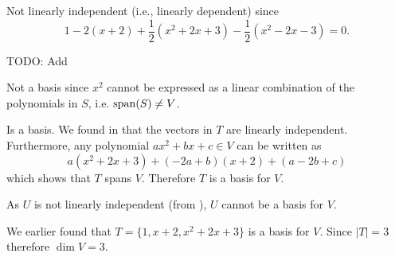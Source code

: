 \begin{questions}
\begin{partquestions}{\alph*}
        \item Not linearly independent (i.e., linearly dependent) since
        \[
            1 - 2(x+2) + \frac12(x^2 + 2x + 3) - \frac12(x^2 - 2x - 3) = 0.
        \]
    \end{partquestions}

    \item TODO: Add

    \item \begin{partquestions}{\alph*}
        \item Not a basis since $x^2$ cannot be expressed as a linear combination of the polynomials in $S$, i.e. $\mathrm{span}(S) \neq V$.

        \item Is a basis. We found in  that the vectors in $T$ are linearly independent. Furthermore, any polynomial $ax^2 + bx + c \in V$ can be written as
        \[
            a(x^2+2x+3) + (-2a+b)(x+2) + (a-2b+c)
        \]
        which shows that $T$ spans $V$. Therefore $T$ is a basis for $V$.

        \item As $U$ is not linearly independent (from ), $U$ cannot be a basis for $V$.
    \end{partquestions}

    \item We earlier found that $T = \{1, x + 2, x^2 + 2x + 3\}$ is a basis for $V$. Since $|T| = 3$ therefore $\dim{V} = 3$.
\end{questions}
